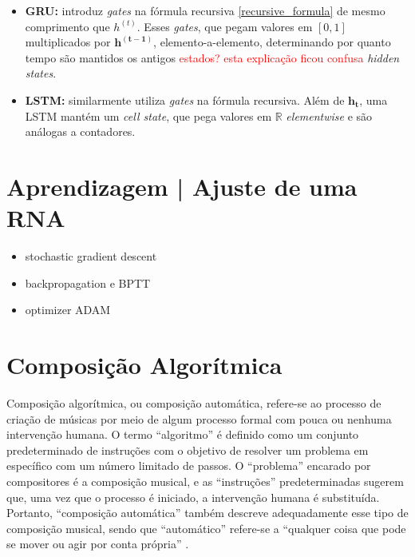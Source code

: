 \documentclass{automatextcc}
\newcommand{\pumi}[1]{\textcolor{red}{#1}}
\newcommand{\R}{\mathds{R}}
\newcommand{\bs}[1]{\boldsymbol{#1}}
\begin{document}
\begin{itemize}
    \item \textbf{GRU:} introduz \textit{gates} na fórmula recursiva \eqref{recursive_formula} de mesmo comprimento que $h^{(t)}$. Esses \textit{gates}, que pegam valores em $[0,1]$ multiplicados por $\bs{h^{(t-1)}}$, elemento-a-elemento, determinando por quanto tempo são mantidos os antigos \pumi{estados? esta explicação ficou confusa} \textit{hidden states}.
    \item \textbf{LSTM:} similarmente utiliza \textit{gates} na fórmula recursiva. Além de $\bs{h_t}$, uma LSTM mantém um \textit{cell state}, que pega valores em $\R$ \textit{elementwise} e são análogas a contadores.
    
\end{itemize}





\section{Aprendizagem | Ajuste de uma RNA}

\begin{itemize}
    \item stochastic gradient descent
    \item backpropagation e BPTT
    \item optimizer ADAM
\end{itemize}

\section{Composição Algorítmica}

Composição algorítmica, ou composição automática, refere-se ao processo de criação de músicas por meio de algum processo formal com pouca ou nenhuma intervenção humana. O termo ``algoritmo'' é definido como um conjunto predeterminado de instruções com o objetivo de resolver um problema em específico com um número limitado de passos. O ``problema'' encarado por compositores é a composição musical, e as ``instruções'' predeterminadas sugerem que, uma vez que o processo é iniciado, a intervenção humana é substituída. Portanto, ``composição automática'' também descreve adequadamente esse tipo de composição musical, sendo que ``automático'' refere-se a ``qualquer coisa que pode se mover ou agir por conta própria'' \citep{alpern1995, maurer}.
\end{document}
